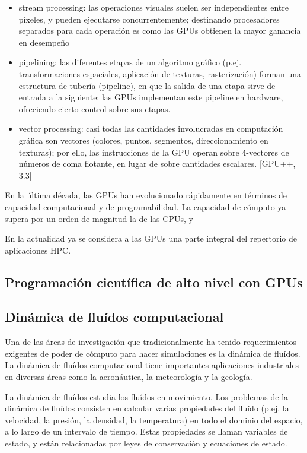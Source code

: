 \documentclass[11pt,spanish]{article}
\begin{document}
\begin{itemize}
  \item stream processing:
    las operaciones visuales suelen ser independientes entre
    píxeles, y pueden ejecutarse concurrentemente;  destinando procesadores
    separados para cada operación es como las GPUs obtienen la mayor ganancia
    en desempeño
    \cite[\S3.2]{gpupp}

  \item pipelining:
    las diferentes etapas de un algoritmo gráfico (p.ej.
    transformaciones espaciales, aplicación de texturas, rasterización)
    forman una estructura de tubería (pipeline), en que la salida de una etapa
    sirve de entrada a la siguiente;  las GPUs implementan este pipeline en
    hardware, ofreciendo cierto control sobre sus etapas.
    \cite[\S 3.1]{pygpu}

  \item vector processing:
    casi todas las cantidades involucradas en computación
    gráfica son vectores (colores, puntos, segmentos, direccionamiento en
    texturas); por ello, las instrucciones de la GPU operan sobre 4-vectores de
    números de coma flotante, en lugar de sobre cantidades escalares.
    [GPU++, 3.3]
\end{itemize}

En la última década, las GPUs han evolucionado rápidamente en términos de
capacidad computacional y de programabilidad.  La capacidad de cómputo ya supera
por un orden de magnitud la de las CPUs, y 

En la actualidad ya se considera a las GPUs una parte integral del repertorio
de aplicaciones HPC.
\cite{gpu-computing}


\subsection{Programación científica de alto nivel con GPUs}


\subsection{Dinámica de fluídos computacional}
Una de las áreas de investigación que tradicionalmente ha tenido requerimientos
exigentes de poder de cómputo para hacer simulaciones es la dinámica de fluídos.
La dinámica de fluídos computacional tiene importantes aplicaciones industriales
en diversas áreas como la aeronáutica, la meteorología y la geología.

La dinámica de fluídos estudia los fluídos en movimiento.  Los problemas de la
dinámica de fluídos consisten en calcular varias propiedades del fluído (p.ej.
la velocidad, la presión, la densidad, la temperatura) en todo el dominio del
espacio, a lo largo de un intervalo de tiempo.  Estas propiedades se llaman
variables de estado, y están relacionadas por leyes de conservación y ecuaciones
de estado.
\end{document}
